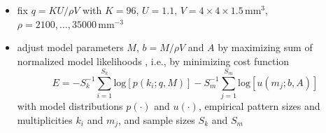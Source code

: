 \documentclass[8pt,t,usepdftitle=false]{beamer}
\begin{document}
\section{\ttl}
\begin{frame}[plain]
  \frametitle{\ttl}
  \begin{itemize}
  \item<1-> fix $q=KU/\rho{}V$
    with $K=96$, $U=1.1$, $V=4\times{}4\times{}1.5\,\text{mm}^3$,  $\rho=2100,\ldots,35000\,\text{mm}^{-3}$
  \item<1-> adjust model parameters $M$, $b=M/\rho{}V$ and $A$ by maximizing sum of normalized model likelihoods
    , i.e., by minimizing cost function
    \begin{equation*}
        E = - S_k^{-1} \sum_{i=1}^{S_k} \text{log}\left[p(k_i;q,M)\right]
      - S_m^{-1}  \sum_{j=1}^{S_m} \text{log}\left[u(m_j;b,A)\right]
    \end{equation*}
    with model distributions $p(\cdot)$ and $u(\cdot)$, empirical pattern sizes and multiplicities $k_i$ and $m_j$, and sample sizes $S_k$ and $S_m$
  \end{itemize}
  \vspace*{2ex}
  \parbox{\linewidth}{
    \hfill%
  }
\end{frame}
\end{document}
